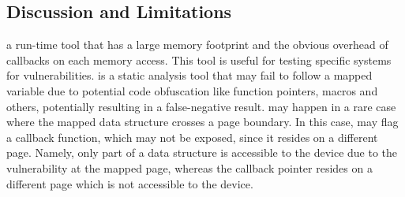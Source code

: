 \DIFaddend \subsection{Discussion and Limitations}
\dkasan \DIFdelbegin {}\DIFdelend \DIFaddbegin {}\DIFaddend a run-time tool that has a large memory footprint and the obvious overhead of callbacks on each memory access. This tool is useful for testing specific systems for vulnerabilities.
\tool is a static analysis tool that may fail to follow a mapped variable due to potential code obfuscation like function pointers, macros and others, potentially resulting in a false-negative result. \DIFdelbegin {}\DIFdelend \DIFaddbegin {}\DIFaddend may happen in a rare case
where the mapped data structure crosses a  page boundary. In this case, \tool may flag a callback function, which may not be exposed, since it resides on a different page. Namely, only part of a data structure is accessible to the device due to the \subpage{} vulnerability at the mapped page, whereas the callback pointer resides on a different page which is not accessible to the device.%
\DIFdelend %
\DIFaddbegin 

\dkasan {}\DIFaddend